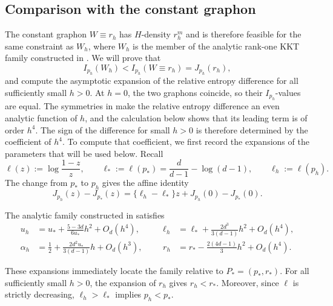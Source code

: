 \subsection{Comparison with the constant graphon}
\label{sec:constant-graphon-comparison}

The constant graphon $W\equiv r_h$ has $H$-density $r_h^m$ and is therefore
feasible for the same constraint as $W_h$, where $W_h$ is the member of the
analytic rank-one KKT family constructed in
.  We will prove that
\[
  I_{p_h}(W_h)<I_{p_h}(W\equiv r_h)=J_{p_h}(r_h),
\]
and compute the asymptotic expansion of the
relative entropy difference for all sufficiently small $h>0$.  At $h=0$, the
two graphons coincide, so their $I_{p_h}$-values are equal.  The symmetries in
 make the relative entropy difference
an even analytic function of $h$, and the calculation below shows that its
leading term is of order $h^4$.  The sign of the difference for small $h>0$ is therefore
determined by the coefficient of $h^4$.  To compute that coefficient, we
first record the expansions of the parameters that will be used below.
Recall
\[
  \ell(z):=\log\frac{1-z}{z}, \qquad
  \ell_*:=\ell(p_*)=\frac d{d-1}-\log(d-1), \qquad
  \ell_h:=\ell(p_h).
\]
The change from $p_*$ to $p_h$ gives the affine identity
\begin{equation}\label{eq:entropy-parameter-shift}
  J_{p_h}(z)-J_{p_*}(z)=\{\ell_h-\ell_*\}z+J_{p_h}(0)-J_{p_*}(0).
\end{equation}

\begin{lemma}
\label{lem:rank-one-parameter-expansions}
The analytic family constructed in
 satisfies
\begin{equation}\label{eq:rank-one-parameter-expansions}
\begin{aligned}
  u_h&=u_*+\frac{5-3d}{6u_*}h^2+O_d(h^4),
  &&&
  \ell_h&=\ell_*+\frac{2d^3}{3(d-1)}h^2+O_d(h^4),\\
  \alpha_h&=\frac12+\frac{2d^2u_*}{3(d-1)}h+O_d(h^3),
  &&&
  r_h&=r_*-\frac{2(4d-1)}3h^2+O_d(h^4).
\end{aligned}
\end{equation}
\end{lemma}

These expansions immediately locate the family relative to
$P_*=(p_*,r_*)$.  For all sufficiently small $h>0$, the expansion of $r_h$
gives $r_h<r_*$.  Moreover, since $\ell$ is strictly decreasing,
$\ell_h>\ell_*$ implies $p_h<p_*$.

